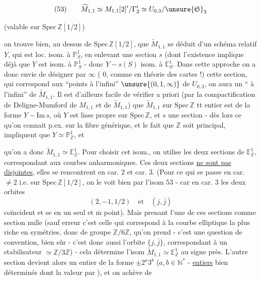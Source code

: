 
\[
(53)\qquad
\widetilde M_{1,1}\simeq M_{1,1}[2]'/\Gamma'_2
\simeq U_{0,3}/\unsure{\mathfrak S}_3
\]

\qquad
(valable sur $\mathrm{Spec}\,\mathbb Z[1/2]$)

on trouve bien, au dessus de $\mathrm{Spec}\,\mathbb Z[1/2]$, que
$\widetilde M_{1,1}$ se déduit d'un schéma relatif $Y$, qui est
 loc.  isom. à $\mathbb P^1_S$,
en enlevant une section $s$ (dont l'existence implique déjà que $Y$ est
 isom. à $\mathbb P^1_S$ - donc
$Y-s(S)$ isom. à $\mathbb E^1_S$.
Dans cette approche on a donc envie de désigner par $\infty$
( $0$, comme en théorie des cartes !) cette section,
qui correspond aux ``points à l'infini'' $\unsure{(0,1,\infty)}$ de
$U_{0,3}$, on aura un `` à l'infini'' de
$\widetilde M_{1,1}$.
Il est d'ailleurs facile de vérifier a priori 
(par la compactification de Deligne-Mumford de $M_{1,1}$ et de
$\widetilde M_{1,1}$) que $\widetilde M_{1,1}$ sur $\mathrm{Spec}\,\mathbb Z$
tt entier est de la forme $Y-\mathrm{Im}\,s$, où $Y$ est lisse propre
sur $\mathrm{Spec}\,\mathbb Z$, et $s$ une section - dès lors ce qu'on
connait p.ex. sur la fibre générique, et le fait que $\mathbb Z$ soit
principal, impliquent que $Y\simeq\mathbb P^1_{\mathbb Z}$, et


qu'on a donc $\widetilde M_{1,1}\simeq\mathbb E^1_{\mathbb Z}$.
Pour  choisir cet isom., on utilise les deux sections de
$\mathbb E^1_{\mathbb Z}$, correspondant aux courbes anharmoniques.
Ces deux sections \uline{ne sont pas} \uline{disjointes}, elles se
rencontrent en car. $2$ et car. $3$.
(Pour ce qui se passe en car. $\ne 2$ i.e. sur
$\mathrm{Spec}\,\mathbb Z[1/2]$, on le voit bien par l'isom $53$ -
 car en car. $3$ les deux orbites
\[
(2,-1,1/2)\quad\text{et}\quad(j,\bar j)
\]
coïncident et se  en un seul et
$\overline{\mathrm m}$ point).
Mais prenant l'une de ces sections comme section nulle
(sauf erreur c'est celle qui correspond à la courbe elliptique la plus
riche en symétries, donc de groupe $\mathbb Z/6\mathbb Z$, qu'on prend -
c'est une question de convention, bien sûr - c'est donc aussi l'orbite
$\{j,\bar j\}$, correspondant à un stabilisateur
$\simeq\mathbb Z/3\mathbb Z$) - cela détermine l'isom
$\widetilde M_{1,1}\simeq\mathbb E^1_{\mathbb Z}$ au signe près.
L'autre section devient alors un entier de la forme
$\pm 2^a3^b$ ($a,b\in\mathbb N^*$ - \uline{entiers} bien déterminés dont
  la valeur par ), et on achève de

